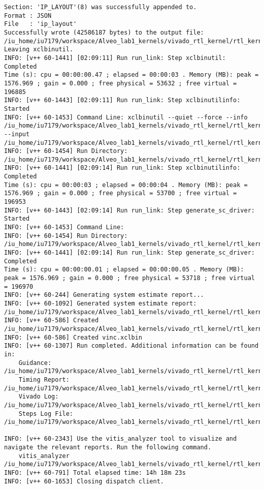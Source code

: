 \begin{lstlisting}[label=func,breaklines=true,breakatwhitespace=false,caption=СОДЕРЖИМОЕ LOG-ФАЙЛА.]
Section: 'IP_LAYOUT'(8) was successfully appended to.
Format : JSON
File   : 'ip_layout'
Successfully wrote (42586187 bytes) to the output file: /iu_home/iu7179/workspace/Alveo_lab1_kernels/vivado_rtl_kernel/rtl_kernel_wizard_0_ex/exports/vinc.xclbin
Leaving xclbinutil.
INFO: [v++ 60-1441] [02:09:11] Run run_link: Step xclbinutil: Completed
Time (s): cpu = 00:00:00.47 ; elapsed = 00:00:03 . Memory (MB): peak = 1576.969 ; gain = 0.000 ; free physical = 53632 ; free virtual = 196885
INFO: [v++ 60-1443] [02:09:11] Run run_link: Step xclbinutilinfo: Started
INFO: [v++ 60-1453] Command Line: xclbinutil --quiet --force --info /iu_home/iu7179/workspace/Alveo_lab1_kernels/vivado_rtl_kernel/rtl_kernel_wizard_0_ex/exports/vinc.xclbin.info --input /iu_home/iu7179/workspace/Alveo_lab1_kernels/vivado_rtl_kernel/rtl_kernel_wizard_0_ex/exports/vinc.xclbin
INFO: [v++ 60-1454] Run Directory: /iu_home/iu7179/workspace/Alveo_lab1_kernels/vivado_rtl_kernel/rtl_kernel_wizard_0_ex/exports/_x/link/run_link
INFO: [v++ 60-1441] [02:09:14] Run run_link: Step xclbinutilinfo: Completed
Time (s): cpu = 00:00:03 ; elapsed = 00:00:04 . Memory (MB): peak = 1576.969 ; gain = 0.000 ; free physical = 53700 ; free virtual = 196953
INFO: [v++ 60-1443] [02:09:14] Run run_link: Step generate_sc_driver: Started
INFO: [v++ 60-1453] Command Line: 
INFO: [v++ 60-1454] Run Directory: /iu_home/iu7179/workspace/Alveo_lab1_kernels/vivado_rtl_kernel/rtl_kernel_wizard_0_ex/exports/_x/link/run_link
INFO: [v++ 60-1441] [02:09:14] Run run_link: Step generate_sc_driver: Completed
Time (s): cpu = 00:00:00.01 ; elapsed = 00:00:00.05 . Memory (MB): peak = 1576.969 ; gain = 0.000 ; free physical = 53718 ; free virtual = 196970
INFO: [v++ 60-244] Generating system estimate report...
INFO: [v++ 60-1092] Generated system estimate report: /iu_home/iu7179/workspace/Alveo_lab1_kernels/vivado_rtl_kernel/rtl_kernel_wizard_0_ex/exports/_x/reports/link/system_estimate_vinc.xtxt
INFO: [v++ 60-586] Created /iu_home/iu7179/workspace/Alveo_lab1_kernels/vivado_rtl_kernel/rtl_kernel_wizard_0_ex/exports/vinc.ltx
INFO: [v++ 60-586] Created vinc.xclbin
INFO: [v++ 60-1307] Run completed. Additional information can be found in:
	Guidance: /iu_home/iu7179/workspace/Alveo_lab1_kernels/vivado_rtl_kernel/rtl_kernel_wizard_0_ex/exports/_x/reports/link/v++_link_vinc_guidance.html
	Timing Report: /iu_home/iu7179/workspace/Alveo_lab1_kernels/vivado_rtl_kernel/rtl_kernel_wizard_0_ex/exports/_x/reports/link/imp/impl_1_xilinx_u200_xdma_201830_2_bb_locked_timing_summary_routed.rpt
	Vivado Log: /iu_home/iu7179/workspace/Alveo_lab1_kernels/vivado_rtl_kernel/rtl_kernel_wizard_0_ex/exports/_x/logs/link/vivado.log
	Steps Log File: /iu_home/iu7179/workspace/Alveo_lab1_kernels/vivado_rtl_kernel/rtl_kernel_wizard_0_ex/exports/_x/logs/link/link.steps.log

INFO: [v++ 60-2343] Use the vitis_analyzer tool to visualize and navigate the relevant reports. Run the following command. 
    vitis_analyzer /iu_home/iu7179/workspace/Alveo_lab1_kernels/vivado_rtl_kernel/rtl_kernel_wizard_0_ex/exports/vinc.xclbin.link_summary 
INFO: [v++ 60-791] Total elapsed time: 14h 18m 23s
INFO: [v++ 60-1653] Closing dispatch client.
\end{lstlisting}